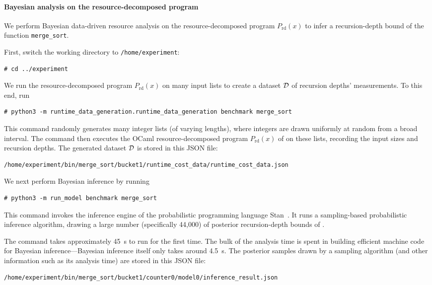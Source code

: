 \paragraph{Bayesian analysis on the resource-decomposed program}

We perform Bayesian data-driven resource analysis on the resource-decomposed
program $P_{\mathrm{rd}}(x)$ to infer a recursion-depth bound of the function
\texttt{merge\_sort}.

First, switch the working directory to \texttt{/home/experiment}:
\begin{verbatim}
# cd ../experiment
\end{verbatim}
%
We run the resource-decomposed program $P_{\mathrm{rd}}(x)$ on many input lists
to create a dataset $\mathcal{D}$ of recursion depths' measurements.
%
To this end, run
\begin{verbatim}
# python3 -m runtime_data_generation.runtime_data_generation benchmark merge_sort
\end{verbatim}
%
This command randomly generates many integer lists (of varying lengths), where
integers are drawn uniformly at random from a broad interval.
%
The command then executes the OCaml resource-decomposed program
$P_{\mathrm{rd}}(x)$ of \mergesort{} on these lists, recording the input sizes
and recursion depths.
%
The generated dataset $\mathcal{D}$ is stored in this JSON file:
\begin{verbatim}
/home/experiment/bin/merge_sort/bucket1/runtime_cost_data/runtime_cost_data.json
\end{verbatim}

We next perform Bayesian inference by running
\begin{verbatim}
# python3 -m run_model benchmark merge_sort
\end{verbatim}
%
This command invokes the inference engine of the probabilistic programming
language Stan~\citep{Carpenter2017}.
%
It runs a sampling-based probabilistic inference algorithm, drawing a large
number (specifically 44,000) of posterior recursion-depth bounds of
\mergesort{}.

The command takes approximately \qty{45}{\second} to run for the first time.
%
The bulk of the analysis time is spent in building efficient machine code for
Bayesian inference---Bayesian inference itself only takes around
\qty{4.5}{\second}.
%
The posterior samples drawn by a sampling algorithm (and other information such
as its analysis time) are stored in this JSON file:
\begin{verbatim}
/home/experiment/bin/merge_sort/bucket1/counter0/model0/inference_result.json
\end{verbatim}

